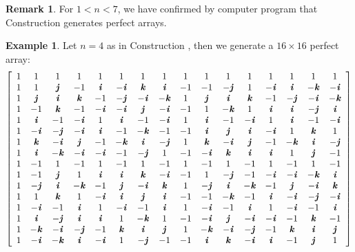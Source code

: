 \documentclass[12pt]{article}
\theoremstyle{definition}
\newtheorem{example}[theorem]{Example}
\newtheorem{remark}{Remark}
\begin{document}
\medskip

\begin{remark} 
For $1<n<7$, we have confirmed by computer program that 
Construction  generates 
perfect arrays.
\end{remark}

\begin{example}
Let $n=4$ as in Construction ,
then we generate a $16\times 16$ perfect array: 
$$\left[
\begin{array}{cccccccccccccccc}
 1 & 1 & 1 & 1 & 1 & 1 & 1 & 1 & 1 & 1 & 1 & 1 & 1 & 1 & 1 & 1 \\
 1 & 1 & \jj & -1 & \ii & -\ii & \kk &
   \ii & -1 & -1 & -\jj & 1 & -\ii & \ii &
   -\kk & -\ii \\
 1 & \jj & \ii & \kk & -1 & -\jj & -\ii &
   -\kk & 1 & \jj & \ii & \kk & -1 & -\jj
   & -\ii & -\kk \\
 1 & -1 & \kk & -1 & -\ii & -\ii & \jj &
   -\ii & -1 & 1 & -\kk & 1 & \ii & \ii &
   -\jj & \ii \\
 1 & \ii & -1 & -\ii & 1 & \ii & -1 & -\ii & 1
   & \ii & -1 & -\ii & 1 & \ii & -1 & -\ii \\
 1 & -\ii & -\jj & -\ii & \ii & -1 & -\kk
   & -1 & -1 & \ii & \jj & \ii & -\ii & 1 &
   \kk & 1 \\
 1 & \kk & -\ii & \jj & -1 & -\kk & \ii &
   -\jj & 1 & \kk & -\ii & \jj & -1 &
   -\kk & \ii & -\jj \\
 1 & \ii & -\kk & -\ii & -\ii & -1 & -\jj
   & 1 & -1 & -\ii & \kk & \ii & \ii & 1 &
   \jj & -1 \\
 1 & -1 & 1 & -1 & 1 & -1 & 1 & -1 & 1 & -1 & 1 & -1 & 1 & -1 & 1 & -1
   \\
 1 & -1 & \jj & 1 & \ii & \ii & \kk &
   -\ii & -1 & 1 & -\jj & -1 & -\ii & -\ii &
   -\kk & \ii \\
 1 & -\jj & \ii & -\kk & -1 & \jj & -\ii
   & \kk & 1 & -\jj & \ii & -\kk & -1 &
   \jj & -\ii & \kk \\
 1 & 1 & \kk & 1 & -\ii & \ii & \jj & \ii
   & -1 & -1 & -\kk & -1 & \ii & -\ii & -\jj &
   -\ii \\
 1 & -\ii & -1 & \ii & 1 & -\ii & -1 & \ii & 1
   & -\ii & -1 & \ii & 1 & -\ii & -1 & \ii \\
 1 & \ii & -\jj & \ii & \ii & 1 & -\kk &
   1 & -1 & -\ii & \jj & -\ii & -\ii & -1 &
   \kk & -1 \\
 1 & -\kk & -\ii & -\jj & -1 & \kk & \ii
   & \jj & 1 & -\kk & -\ii & -\jj & -1 &
   \kk & \ii & \jj \\
 1 & -\ii & -\kk & \ii & -\ii & 1 & -\jj
   & -1 & -1 & \ii & \kk & -\ii & \ii & -1 &
   \jj & 1
\end{array}
\right]$$
\end{example}
\end{document}
